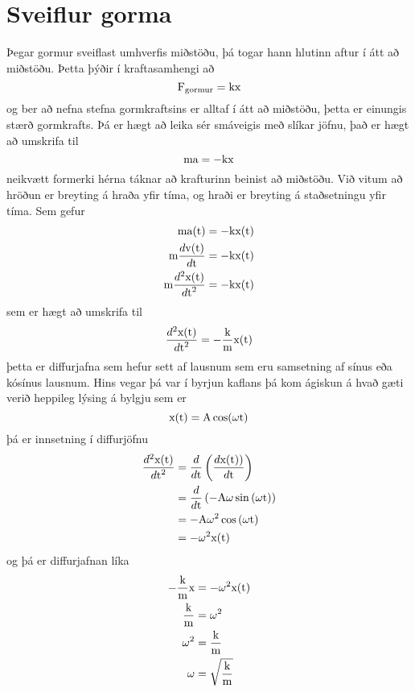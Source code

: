 \section{Sveiflur gorma}
Þegar gormur sveiflast umhverfis miðstöðu, þá togar hann hlutinn aftur í átt
að miðstöðu. Þetta þýðir í kraftasamhengi að
\begin{equation}
	\textrm{F}_\text{gormur} = \text{k} \textrm{x}
\end{equation}
og ber að nefna stefna gormkraftsins er alltaf í átt að miðstöðu, þetta er einungis
stærð gormkrafts. Þá er hægt að
leika sér smáveigis með slíkar jöfnu, það er hægt að umskrifa til
\[
	\textrm{m} \textrm{a} = -\text{k} \textrm{x}
\]
neikvætt formerki hérna táknar að krafturinn beinist að miðstöðu. Við vitum
að hröðun er breyting á hraða yfir tíma, og hraði er breyting á staðsetningu yfir
tíma. Sem gefur
\begin{align*}
	\textrm{m} \textrm{a}(\textrm{t}) &= -\text{k} \textrm{x}(\textrm{t}) \\
	\textrm{m} \frac{d \textrm{v}(\textrm{t})}{d \textrm{t}} &= -\text{k} \textrm{x}(\textrm{t}) \\
	\textrm{m} \frac{d^2 \textrm{x}(\textrm{t})}{d \textrm{t}^2} &= -\text{k} \textrm{x}(\textrm{t})
\end{align*}
sem er hægt að umskrifa til
\[
	\frac{d^2 \textrm{x}(\textrm{t})}{d \textrm{t}^2} = -\frac{\text{k}}{\textrm{m}} \textrm{x}(\textrm{t})
\]
þetta er diffurjafna sem hefur sett af lausnum sem eru samsetning af sínus eða
kósínus lausnum. Hins vegar þá var í byrjun kaflans þá kom ágiskun á hvað gæti
verið heppileg lýsing á bylgju sem er
\[
	\text{x}(\textrm{t}) = \text{A} \cos (\omega \textrm{t})
\]
þá er innsetning í diffurjöfnu
\begin{align*}
	\frac{d^2 \textrm{x}(\textrm{t})}{d \textrm{t}^2}
		&= \frac{d}{d \textrm{t}}\left( \frac{d \textrm{x}(\textrm{t}))}{d \textrm{t}} \right) \\
		&= \frac{d}{d \textrm{t}}\left( -\text{A} \omega \sin{(\omega\textrm{t})}  \right) \\
		&= -\text{A} \omega^2 \cos{(\omega\textrm{t})} \\
		&= - \omega^2 \text{x}(\textrm{t})
\end{align*}
og þá er diffurjafnan líka
\begin{align*}
	-\frac{\text{k}}{\textrm{m}} \textrm{x} &= - \omega^2 \text{x}(\textrm{t}) \\
	\frac{\text{k}}{\textrm{m}} &= \omega^2 \\
	\omega^2 &= \frac{\text{k}}{\textrm{m}} \\
	\omega &= \sqrt{\frac{\text{k}}{\textrm{m}}}
\end{align*}
